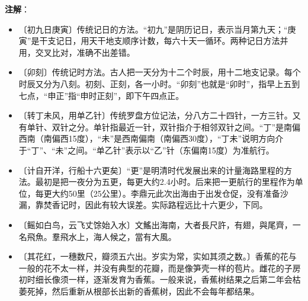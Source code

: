 \documentclass[12pt,UTF-8,openany]{ctexbook}
\begin{document}
\newpage

\textbf{注解}：

\vspace{-1em}

\begin{itemize}
    \setlength\itemsep{-0.2em}
    \item〔初九日庚寅〕传统记日的方法。“初九”是阴历记日，表示当月第九天；“庚寅”是干支记日，用天干地支顺序计数，每六十天一循环。两种记日方法并用，交叉比对，准确不出差错。
    \item〔卯刻〕传统记时方法。古人把一天分为十二个时辰，用十二地支记录。每个时辰又分为八刻。初刻、正刻，各一小时。“卯刻”也就是“卯时”，指早上五到七点，“申正”指“申时正刻”，即下午四点正。
    \item〔转丁未风，用单乙针〕传统罗盘方位记法，分八方二十四针，一方三针。又有单针、双针之分。单针指最近一针，双针指介于相邻双针之间。“丁”是南偏西南（南偏西15度），“未”是西南偏南（南偏西30度），“丁未”说明方向介于“丁”、“未”之间。“单乙针”表示以“乙”针（东偏南15度）为准航行。
    \item〔计自开洋，行船十六更矣〕“更”是明清时代发展出来的计量海路里程的方法。最初是把一夜分为五更，每更大约2.4小时。后来把一更航行的里程作为单位，每更大约50里（25公里）。李鼎元此次出海由于出发仓促，没有准备沙漏，靠焚香记时，因此有较大误差。实际路程远比十六更少，下同。
    \item〔鳐如白鸟，云飞丈馀始入水〕文鰩出海南，大者長尺許，有翅，與尾齊，一名飛魚。羣飛水上，海人候之，當有大風。
    \item〔其花红，一穗数尺，瓣须五六出。岁实为常，实如其须之数。〕香蕉的花与一般的花不太一样，并没有典型的花瓣，而是像笋壳一样的苞片。雌花的子房初时细长像须一样，逐渐发育为香蕉。一般来说，香蕉树结果之后第二年会枯萎死掉，然后重新从根部长出新的香蕉树，因此不会每年都结果。
\end{itemize}
\end{document}
